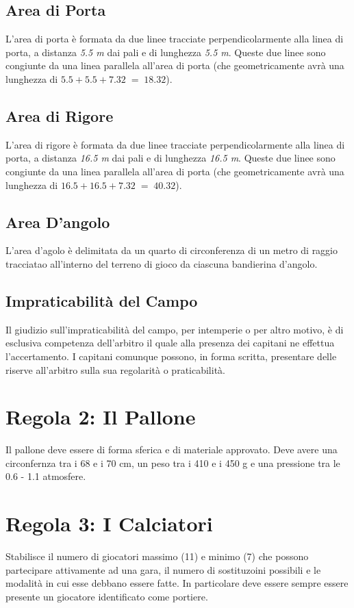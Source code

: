 \documentclass[../uefaC.tex]{subfiles}
\begin{document}
\subsection{Area di Porta}
L'area di porta è formata da due linee tracciate perpendicolarmente alla linea di porta, a distanza \emph{5.5 m} dai pali e di lunghezza \emph{5.5 m}. Queste due linee sono congiunte da una linea parallela all'area di porta (che geometricamente avrà una lunghezza di $ 5.5 + 5.5 + 7.32 \; = \; 18.32$).

\subsection{Area di Rigore}
L'area di rigore è formata da due linee tracciate perpendicolarmente alla linea di porta, a distanza \emph{16.5 m} dai pali e di lunghezza \emph{16.5 m}. Queste due linee sono congiunte da una linea parallela all'area di porta (che geometricamente avrà una lunghezza di $ 16.5 + 16.5 + 7.32 \; = \; 40.32$).

\subsection{Area D'angolo}
L'area d'agolo è delimitata da un quarto di circonferenza di un metro di raggio tracciatao all'interno del terreno di gioco da ciascuna bandierina d'angolo.

\subsection{Impraticabilità del Campo}
Il giudizio sull'impraticabilità del campo, per intemperie o per altro motivo, è di esclusiva competenza dell'arbitro il quale alla presenza dei capitani ne effettua l'accertamento. I capitani comunque possono, in forma scritta, presentare delle riserve all'arbitro sulla sua regolarità o praticabilità.


\section{Regola 2: Il Pallone}
Il pallone deve essere di forma sferica e di materiale approvato. Deve avere una circonfernza tra i 68 e i 70 cm, un peso tra i 410 e i 450 g e una pressione tra le 0.6 - 1.1 atmosfere.

\section{Regola 3: I Calciatori}
Stabilisce il numero di giocatori massimo (11) e minimo (7) che possono partecipare attivamente ad una gara, il numero di sostituzoini possibili e le modalità in cui esse debbano essere fatte. In particolare deve essere sempre essere presente un giocatore identificato come portiere.
\end{document}
